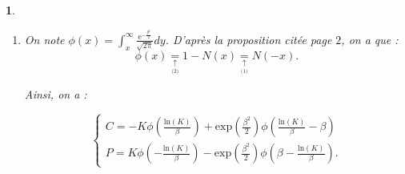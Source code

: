 \documentclass{article}
\theoremstyle{exostyle}
\newtheorem{exercice}{}
\newenvironment{questions}{
\begin{enumerate}[\hspace{12pt} 1.]}{\end{enumerate}}
\begin{document}
\begin{exercice}
\begin{questions}
\[I_{2} = \int_{-\infty}^{\frac{\text{ln}(K)}{\beta}}\frac{1}{\sqrt{2\pi}}\text{exp}\left(-\frac{1}{2}(x-\beta)^{2}+\frac{\beta^{2}}{2} \right)dx.\]

On fait un changement de variable : on pose $y = x-\beta$, donc $dy=dx$.\\
\\
Donc, 

\begin{align*}
    I_{2} &= \int_{-\infty}^{\frac{\text{ln}(K)}{\beta}-\beta} \frac{1}{\sqrt{2\pi}}\text{exp}\left( -\frac{1}{2}y^{2}\right) \text{exp}\left( \frac{\beta^{2}}{2}\right)dy\\
    &= \text{exp}\left( \frac{\beta^{2}}{2}\right) \int_{-\infty}^{\frac{\text{ln}(K)}{\beta}-\beta} \frac{1}{\sqrt{2\pi}}\text{exp}\left( -\frac{1}{2}y^{2}\right)dy\\
    \leftbrace{\text{Par définition de $N$} \rightarrow} &= \text{exp}\left( \frac{\beta^{2}}{2}\right) N\left( \frac{\text{ln}(K)}{\beta} - \beta \right).
\end{align*}


Finalement, on a : 

\hspace{3.4cm}

\bigbreak
\bigbreak

\underline{Remarque :} On aurait pu aussi utiliser la formule de parité pour retrouver $P$.

\bigbreak
\bigbreak


\item On note $\phi(x) = \int_{x}^{\infty}\frac{\text{e}^{-\frac{y^{2}}{2}}}{\sqrt{2\pi}}dy$. D'après la proposition citée page $2$, on a que : \[\phi(x) \underset{\underset{\text{(2)}}{\uparrow}}{=} 1-N(x) \underset{\underset{\text{(1)}}{\uparrow}}{=} N(-x).\]

Ainsi, on a :

\[\left\{
  \begin{array}{lll}
    C = -K\phi \left( \frac{\text{ln}(K)}{\beta} \right) + \text{exp} \left( \frac{\beta^{2}}{2} \right) \phi \left( \frac{\text{ln}(K)}{\beta} - \beta \right)\\
    P = K\phi \left( - \frac{\text{ln}(K)}{\beta} \right) - \text{exp} \left( \frac{\beta^{2}}{2} \right) \phi \left( \beta - \frac{\text{ln}(K)}{\beta} \right).
\end{array}
\right.\]

\end{questions}

\end{exercice}
\end{document}
